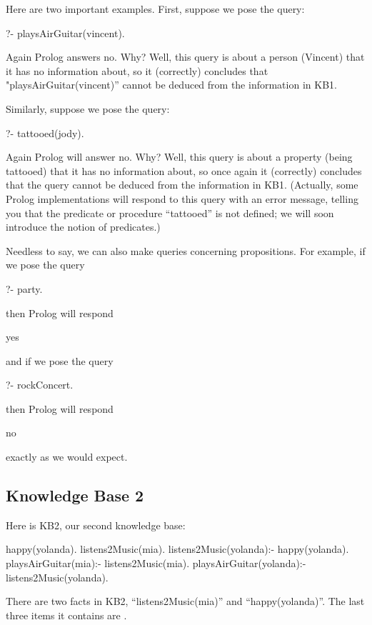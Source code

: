 Here are two important examples. First, suppose we pose the query:
\begin{LPNcodedisplay}
?- playsAirGuitar(vincent).
\end{LPNcodedisplay}
Again Prolog answers no. Why? Well, this query is about a person (Vincent)
that it has no information about, so it (correctly) concludes that
"playsAirGuitar(vincent)'' cannot be deduced from the information in KB1.

Similarly, suppose we pose the query:
\begin{LPNcodedisplay}
?- tattooed(jody).
\end{LPNcodedisplay}
Again Prolog will answer no. Why? Well, this query is about a property
(being tattooed) that it has no information about, so once again it
(correctly) concludes that the query cannot be deduced from the
information in KB1.  (Actually, some Prolog implementations will
respond to this query with an error message, telling you that the
predicate or procedure ``tattooed'' is not defined; we will soon
introduce the notion of predicates.)

Needless to say, we can also make queries concerning propositions. For example,
if we pose the query
\begin{LPNcodedisplay}
?- party.
\end{LPNcodedisplay}
then Prolog will respond
\begin{LPNcodedisplay}
yes
\end{LPNcodedisplay}
and if we pose the query
\begin{LPNcodedisplay}
?- rockConcert.
\end{LPNcodedisplay}
then Prolog will respond
\begin{LPNcodedisplay}
no
\end{LPNcodedisplay}
exactly as we would expect.

\subsection*{Knowledge Base 2}\label{SUBSEC.L1.KB2}

Here is KB2, our second knowledge base:

\begin{LPNcodedisplay}
happy(yolanda).
listens2Music(mia).
listens2Music(yolanda):- happy(yolanda).
playsAirGuitar(mia):- listens2Music(mia).
playsAirGuitar(yolanda):- listens2Music(yolanda).
\end{LPNcodedisplay}
There are two facts in KB2, ``listens2Music(mia)'' and ``happy(yolanda)''.
The last three items it contains are .

